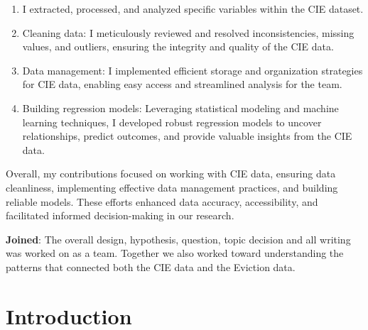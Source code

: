 \documentclass[man, 12pt, donotrepeattitle, floatsintext]{apa7} %
\begin{document}
\begin{enumerate}
    \item I extracted, processed, and analyzed specific variables within the CIE dataset.
    \item Cleaning data: I meticulously reviewed and resolved inconsistencies, missing values, and outliers, ensuring the integrity and quality of the CIE data.
    \item Data management: I implemented efficient storage and organization strategies for CIE data, enabling easy access and streamlined analysis for the team.
    \item Building regression models: Leveraging statistical modeling and machine learning techniques, I developed robust regression models to uncover relationships, predict outcomes, and provide valuable insights from the CIE data.
\end{enumerate}

Overall, my contributions focused on working with CIE data, ensuring data cleanliness, implementing effective data management practices, and building reliable models. These efforts enhanced data accuracy, accessibility, and facilitated informed decision-making in our research.

\textbf{Joined}:
	The overall design, hypothesis, question, topic decision and all writing was worked on as a team. Together we also worked toward understanding the patterns that connected both the CIE data and the Eviction data. 







\section{Introduction} %
\end{document}

